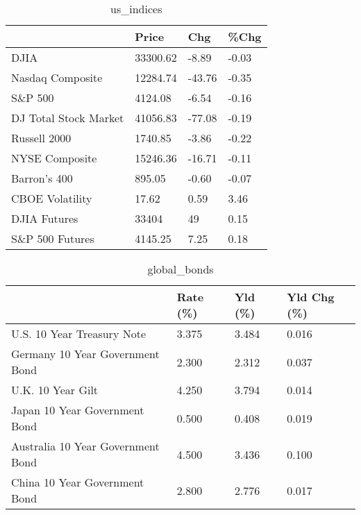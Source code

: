 \documentclass{article}%
\begin{document}
%


\begin{table}[htbp]%
\caption{us\_indices}%
\centering%
\begin{adjustbox}{width=1\textwidth}%
\begin{tabular}{llll}
\toprule
                      &    Price &    Chg &  \%Chg \\
\midrule
                 DJIA & 33300.62 &  -8.89 & -0.03 \\
     Nasdaq Composite & 12284.74 & -43.76 & -0.35 \\
              S\&P 500 &  4124.08 &  -6.54 & -0.16 \\
DJ Total Stock Market & 41056.83 & -77.08 & -0.19 \\
         Russell 2000 &  1740.85 &  -3.86 & -0.22 \\
       NYSE Composite & 15246.36 & -16.71 & -0.11 \\
         Barron's 400 &   895.05 &  -0.60 & -0.07 \\
      CBOE Volatility &    17.62 &   0.59 &  3.46 \\
         DJIA Futures &    33404 &     49 &  0.15 \\
      S\&P 500 Futures &  4145.25 &   7.25 &  0.18 \\
\bottomrule
\end{tabular}
%
\end{adjustbox}%
\end{table}

%


\begin{table}[htbp]%
\caption{global\_bonds}%
\centering%
\begin{adjustbox}{width=1\textwidth}%
\begin{tabular}{llll}
\toprule
                                  & Rate (\%) & Yld (\%) & Yld Chg (\%) \\
\midrule
       U.S. 10 Year Treasury Note &    3.375 &   3.484 &       0.016 \\
  Germany 10 Year Government Bond &    2.300 &   2.312 &       0.037 \\
                U.K. 10 Year Gilt &    4.250 &   3.794 &       0.014 \\
    Japan 10 Year Government Bond &    0.500 &   0.408 &       0.019 \\
Australia 10 Year Government Bond &    4.500 &   3.436 &       0.100 \\
    China 10 Year Government Bond &    2.800 &   2.776 &       0.017 \\
\bottomrule
\end{tabular}
%
\end{adjustbox}%
\end{table}
\end{document}
